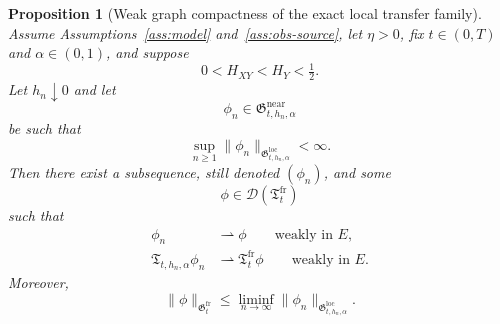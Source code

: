 \documentclass[11pt,a4paper]{amsart}
\theoremstyle{plain}
\newtheorem{proposition}[theorem]{Proposition}
\theoremstyle{definition}
\theoremstyle{remark}
\begin{document}
\begin{proposition}[Weak graph compactness of the exact local transfer family]
\label{prop:local-graph-compact}
Assume Assumptions~\ref{ass:model} and~\ref{ass:obs-source}, let \(\eta>0\), fix \(t\in(0,T)\)
and \(\alpha\in(0,1)\), and suppose
\[
0<H_{XY}<H_Y<\tfrac12.
\]
Let \(h_n\downarrow0\) and let
\[
\phi_n\in\mathfrak G_{t,h_n,\alpha}^{\mathrm{near}}
\]
be such that
\begin{equation}\label{eq:local-graph-bounded}
\sup_{n\ge1}\|\phi_n\|_{\mathfrak G_{t,h_n,\alpha}^{\mathrm{loc}}}<\infty.
\end{equation}
Then there exist a subsequence, still denoted \((\phi_n)\), and some
\[
\phi\in\mathcal D(\mathfrak T_t^{\mathrm{fr}})
\]
such that
\begin{align}
\phi_n &\rightharpoonup \phi
\qquad\text{weakly in }E, \label{eq:local-graph-weak-input}\\
\mathfrak T_{t,h_n,\alpha}\phi_n &\rightharpoonup \mathfrak T_t^{\mathrm{fr}}\phi
\qquad\text{weakly in }E. \label{eq:local-graph-weak-output}
\end{align}
Moreover,
\begin{equation}\label{eq:local-graph-liminf}
\|\phi\|_{\mathfrak G_t^{\mathrm{fr}}}
\le
\liminf_{n\to\infty}\|\phi_n\|_{\mathfrak G_{t,h_n,\alpha}^{\mathrm{loc}}}.
\end{equation}
\end{proposition}
\end{document}
